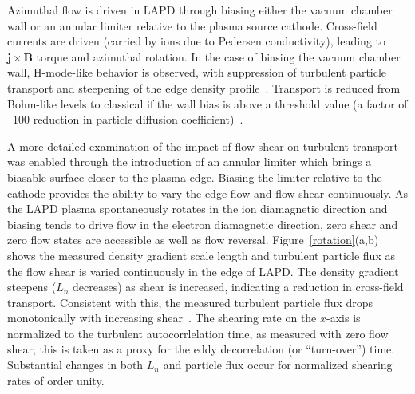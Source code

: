 \documentclass[11pt]{article}
\renewcommand{\cite}{\citep}
\begin{document}
Azimuthal flow is driven in LAPD through biasing either the vacuum
chamber wall or an annular limiter relative to the plasma source
cathode.  Cross-field currents are driven (carried by ions due to
Pedersen conductivity), leading to $\mathbf j \times \mathbf B$ torque
and azimuthal rotation.  In the case of biasing the vacuum chamber
wall, H-mode-like behavior is observed, with suppression of turbulent
particle transport and steepening of the edge density
profile~\cite{maggs:2007,carter:2009}.  Transport is reduced from
Bohm-like levels to classical if the wall bias is above a threshold value (a factor of
~100 reduction in particle diffusion coefficient)~\cite{maggs:2007}.

A more detailed examination of the impact of flow shear on turbulent
transport was enabled through the introduction of an annular limiter
which brings a biasable surface closer to the plasma edge.  Biasing
the limiter relative to the cathode provides the ability to vary the
edge flow and flow shear continuously.  As the LAPD plasma
spontaneously rotates in the ion diamagnetic direction and biasing
tends to drive flow in the electron diamagnetic direction, zero shear
and zero flow states are accessible as well as flow reversal.
Figure~\ref{rotation}(a,b) shows the measured density gradient scale
length and turbulent particle flux as the flow shear is varied
continuously in the edge of LAPD.  The density gradient steepens
($L_n$ decreases) as shear is increased, indicating a reduction in
cross-field transport.  Consistent with this, the measured turbulent
particle flux drops monotonically with increasing shear~\cite{schaffner:2012}.  The shearing
rate on the $x$-axis is normalized to the turbulent autocorrlelation
time, as measured with zero flow shear; this is taken as a proxy for
the eddy decorrelation (or ``turn-over'') time.  Substantial changes
in both $L_n$ and particle flux occur for normalized shearing rates
of order unity.
\end{document}
